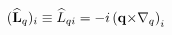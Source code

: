 \begin{equation}
(\widehat{\mathbf{L}}_{q})_{i}\equiv \widehat{L}_{qi}=-i\left( \mathbf{%
q\times }\nabla _{q}\right) _{i}
\end{equation}

